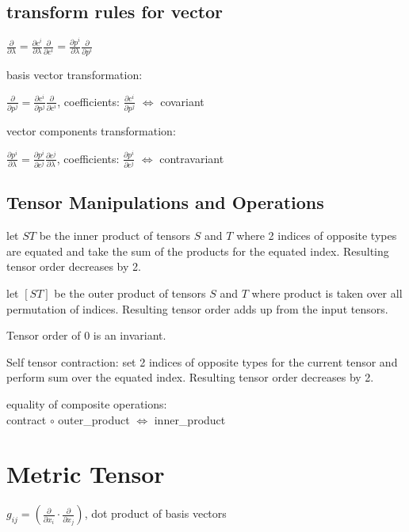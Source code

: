 \documentclass[8pt,letter]{article}
\begin{document}
\begin{multicols*}{2}
  \subsection{transform rules for vector}

  $\frac{\partial}{\partial \lambda} = \frac{\partial c^i}{\partial \lambda} \frac{\partial}{\partial c^i} = \frac{\partial p^i}{\partial \lambda} \frac{\partial}{\partial p^i}$
  
  basis vector transformation:

  $\frac{\partial}{\partial p^j} = \frac{\partial c^i}{\partial p^j} \frac{\partial}{\partial c^i}$, coefficients: $\frac{\partial c^i}{\partial p^j}$ $\iff$ covariant

  vector components transformation:

  $\frac{\partial p^i}{\partial \lambda} = \frac{\partial p^i}{\partial c^j} \frac{\partial c^j}{\partial \lambda}$, coefficients: $\frac{\partial p^i}{\partial c^j}$ $\iff$ contravariant
  
  \subsection{Tensor Manipulations and Operations}

  let $ST$ be the inner product of tensors $S$ and $T$ where 2 indices of opposite types are equated and take the sum of the products for the equated index. Resulting tensor order decreases by 2.

  let $[ST]$ be the outer product of tensors $S$ and $T$ where product is taken over all permutation of indices. Resulting tensor order adds up from the input tensors.

  Tensor order of 0 is an invariant.

  Self tensor contraction: set 2 indices of opposite types for the current tensor and perform sum over the equated index. Resulting tensor order decreases by 2.

  equality of composite operations:\\
  contract $\circ$ outer\_product $\iff$ inner\_product

  \vfill\null
  \pagebreak
  
  \section{Metric Tensor}

  $g_{ij} = (\frac{\partial}{\partial x_i} \cdot \frac{\partial}{\partial x_j})$, dot product of basis vectors


\end{multicols*}
\end{document}
